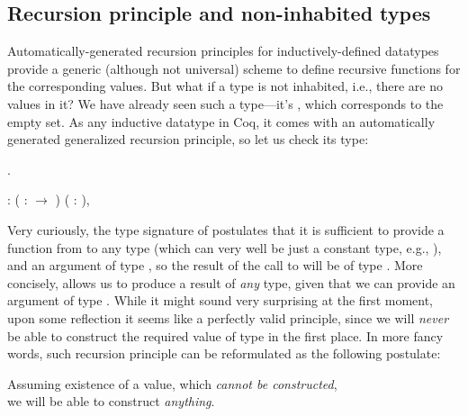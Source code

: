\subsection{Recursion principle and non-inhabited types}




Automatically-generated recursion principles for inductively-defined
datatypes provide a generic (although not universal) scheme to define
recursive functions for the corresponding values. But what if a type
is not inhabited, i.e., there are no values in it? We have already
seen such a type---it's , which corresponds to the empty
set. As any inductive datatype in Coq, it comes with an automatically
generated generalized recursion principle, so let us check its type:
\begin{coqdoccode}
\coqdocemptyline
\coqdocnoindent
{} .\coqdoceol
\coqdocemptyline
\end{coqdoccode}


\coqdoceol
\coqdocemptyline
\coqdocnoindent
{}\coqdoceol
\coqdocindent{2.50em}
: \coqdockw{\ensuremath{\forall}} ( :  \ensuremath{\rightarrow} ) ( : ),  

\coqdocemptyline


Very curiously, the type signature of  postulates that it
is sufficient to provide a function from  to any type (which
can very well be just a constant type, e.g., ), and an argument
 of type , so the result of the call to  will be
of type  . More concisely,  allows us to produce a
result of \textit{any} type, given that we can provide an argument of type
. While it might sound very surprising at the first moment,
upon some reflection it seems like a perfectly valid principle, since
we will \textit{never} be able to construct the required value of type
 in the first place. In more fancy words, such recursion
principle can be reformulated as the following postulate:



\begin{center}

Assuming existence of a value, which \emph{cannot be constructed},\\
we will be able to construct \emph{anything}.

\end{center}



